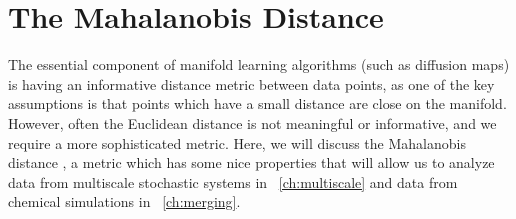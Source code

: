 %
%


\section{The Mahalanobis Distance}
\label{sec:mahalanobis}

The essential component of manifold learning algorithms (such as diffusion maps) is having an informative distance metric between data points, as one of the key assumptions is that points which have a small distance are close on the manifold. 
%
However, often the Euclidean distance is not meaningful or informative, and we require a more sophisticated metric. 
%
Here, we will discuss the Mahalanobis distance \cite{mahalanobis1936generalized}, a metric which has some nice properties that will allow us to analyze data from multiscale stochastic systems in \chap~\ref{ch:multiscale} and data from chemical simulations in \chap~\ref{ch:merging}. 

